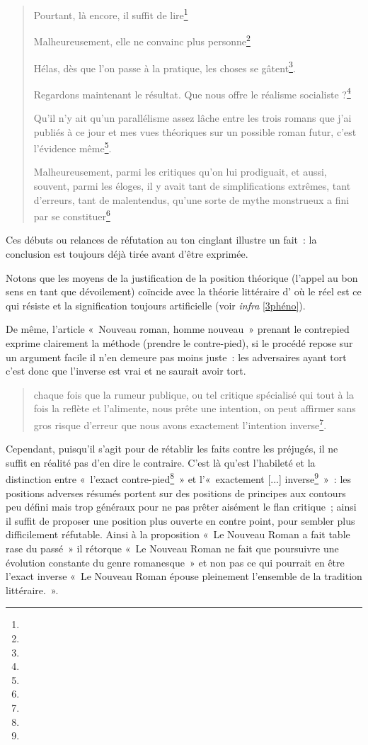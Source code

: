 \documentclass[12pt, a4paper]{article}
\begin{document}
\begin{quote}
    Pourtant, là encore, il suffit de lire\footnote{}


    Malheureusement, elle ne convainc plus personne\footnote{}


    Hélas, dès que l’on passe à la pratique, les choses se gâtent\footnote{}.

    Regardons maintenant le résultat. Que nous offre le réalisme socialiste ?\footnote{}

    Qu’il n’y ait qu’un parallélisme assez lâche entre les trois romans que j’ai publiés à ce jour et mes vues théoriques sur un possible roman futur, c’est l’évidence même\footnote{}.

    Malheureusement, parmi les critiques qu’on lui prodiguait, et aussi, souvent, parmi les éloges, il y avait tant de simplifications extrêmes, tant d’erreurs, tant de malentendus, qu’une sorte de mythe monstrueux a fini par se constituer\footnote{}
\end{quote}
Ces débuts ou relances de réfutation au ton cinglant illustre un fait~: la conclusion est toujours déjà tirée avant d'être exprimée.

Notons que les moyens de la justification de la position théorique (l'appel au bon sens en tant que dévoilement) coïncide avec la théorie littéraire d'\robbe{} où le réel est ce qui résiste et la signification toujours artificielle (voir \textit{infra} \ref{3phéno}).

De même, l'article «~Nouveau roman, homme nouveau~» prenant le contrepied exprime clairement la méthode (prendre le contre-pied), si le procédé repose sur un argument facile il n'en demeure pas moins juste~: les adversaires ayant tort c'est donc que l'inverse est vrai et \robbe{} ne saurait avoir tort. 
\begin{quote}
    chaque fois que la rumeur publique, ou tel critique spécialisé qui tout à la fois la reflète et l’alimente, nous prête une intention, on peut affirmer sans gros risque d’erreur que nous avons exactement l’intention inverse\footnote{}.
\end{quote}
Cependant, puisqu'il s'agit pour \robbe{} de rétablir les faits contre les préjugés, il ne suffit en réalité pas d'en dire le contraire. C'est là qu'est l'habileté et la distinction entre «~l'exact contre-pied\footnote{}~» et l'«~exactement [...] inverse\footnote{}~»~: les positions adverses résumés portent sur des positions de principes aux contours peu défini mais trop généraux pour ne pas prêter aisément le flan critique~; ainsi il suffit de proposer une position plus ouverte en contre point, pour sembler plus difficilement réfutable. Ainsi à la proposition «~Le Nouveau Roman a fait table rase du passé~» il rétorque «~Le Nouveau Roman ne fait que poursuivre une évolution constante du genre romanesque~» et non pas ce qui pourrait en être l'exact inverse «~Le Nouveau Roman épouse pleinement l'ensemble de la tradition littéraire.~».
\end{document}
